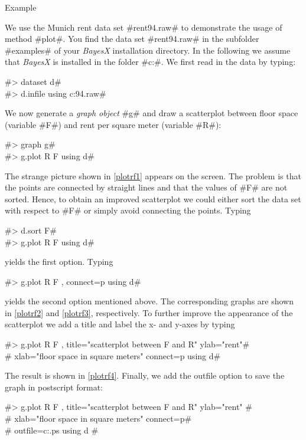 \begin{stanza}{Example}

{We use the Munich rent data set #rent94.raw# to demonstrate the
usage of method #plot#. You find the data set #rent94.raw# in the
subfolder #examples# of your {\em BayesX} installation directory.
In the following we assume that {\em BayesX} is installed in the
folder #c:\bayesx#.
We first read in the data by typing:

#> dataset d# \\
#> d.infile using c:\bayesx\examples\rent94.raw#

We now generate a {\em graph object} #g# and draw a scatterplot
between floor space (variable #F#)
and rent per square meter (variable #R#):

#> graph g# \\
#> g.plot R F using d#

The strange picture shown in \autoref{plotrf1} appears on the
screen. The problem is that the points are connected by straight
lines and that the values of #F# are not sorted. Hence, to obtain
an improved scatterplot we could either sort the data set with
respect to #F# or simply avoid connecting the points.
Typing

#> d.sort F# \\
#> g.plot R F using d#

yields the first option. Typing

#> g.plot R F , connect=p using d#

yields the second option mentioned above. The corresponding graphs
are shown in \autoref{plotrf2} and \autoref{plotrf3},
respectively. To further improve the appearance of the scatterplot
we add a title and label the x- and y-axes
by typing

#> g.plot R F , title="scatterplot between F and R" ylab="rent"# \\
#  xlab="floor space in square meters" connect=p using d#

The result is shown in \autoref{plotrf4}.
Finally, we add the outfile option to save the graph in postscript format:

 #> g.plot R F , title="scatterplot between F and R" ylab="rent" #\\
 #  xlab="floor space in square meters" connect=p#\\
 #  outfile=c:\temp\plotrf.ps using d #

}
\end{stanza}
